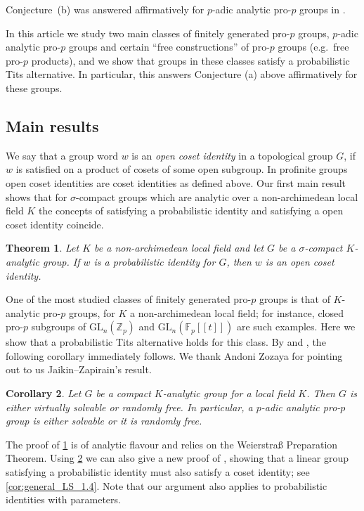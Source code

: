 \documentclass[a4paper,10pt]{amsart}
\theoremstyle{plain}
\newtheorem{thmABC}{Theorem}
\newtheorem{corABC}[thmABC]{Corollary}
\theoremstyle{definition}
\numberwithin{equation}{section}
\begin{document}
Conjecture~(b) was answered affirmatively for $p$-adic analytic pro-$p$ groups in \cite[Prop.~1.9]{BG}.

In this article we study two main classes of finitely generated pro-$p$ groups, $p$-adic analytic pro-$p$ groups and certain ``free constructions'' of pro-$p$ groups (e.g.\ free pro-$p$ products), and we show that groups in these classes satisfy a probabilistic Tits alternative. In particular, this answers Conjecture (a) above affirmatively for these groups.  


\subsection{Main results}
We say that a group word $w$ is an \emph{open coset identity} in a topological group $G$, if $w$ is satisfied on a product of cosets of some open subgroup. In profinite groups open coset identities are coset identities as defined above. Our first main result shows that for $\sigma$-compact groups which are analytic over a non-archimedean local field $K$ the concepts of satisfying a probabilistic identity and satisfying a open coset identity coincide.

\begin{thmABC}\label{thm:analytic}
Let $K$ be a non-archimedean local field and let $G$ be a $\sigma$-compact $K$-analytic group. If $w$ is a probabilistic identity for $G$, then $w$ is an open coset identity.
\end{thmABC}

One of the most studied classes of finitely generated pro-$p$ groups is that of $K$-analytic pro-$p$ groups, for $K$ a non-archimedean local field; for instance, closed pro-$p$ subgroups of $\mathrm{GL}_n(\mathbb{Z}_p)$ and $\mathrm{GL}_n(\mathbb{F}_p[\![t]\!])$ are such examples. Here we show that a probabilistic Tits alternative holds for this class. 
By \cite[Thm.~1.3]{BG} and \cite[Proposition 5.1]{JZ02}, the following corollary immediately follows. We thank Andoni Zozaya for pointing out to us Jaikin--Zapirain's result.

\begin{corABC}\label{cor:3.5}
    Let $G$ be a compact $K$-analytic group for a local field $K$.
    Then $G$ is either virtually solvable or randomly free. In particular, a $p$-adic analytic pro-$p$ group is either solvable or it is randomly free.
\end{corABC}

The proof of \cref{thm:analytic} is of analytic flavour and relies on the Weierstra\ss{} Preparation Theorem. Using \cref{cor:3.5} we can also give a new proof of \cite[Thm.~1.4]{LS16}, showing that a linear group satisfying a probabilistic identity must also satisfy a coset identity; see \cref{cor:general_LS_1.4}. Note that our argument also applies to probabilistic identities with parameters.
\end{document}
